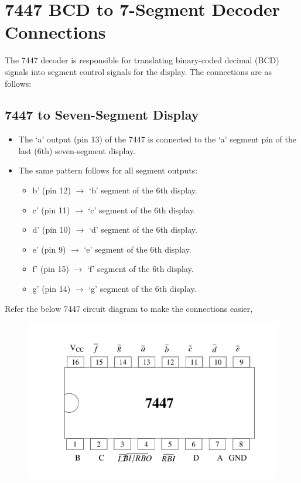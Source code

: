 \documentclass[journal]{IEEEtran}
\begin{document}
\section{7447 BCD to 7-Segment Decoder Connections}

The 7447 decoder is responsible for translating binary-coded decimal (BCD) signals into segment control signals for the display. The connections are as follows:

\subsection{7447 to Seven-Segment Display}

\begin{itemize}
    \item The ‘a’ output (pin 13) of the 7447 is connected to the ‘a’ segment pin of the last (6th) seven-segment display.
    \item The same pattern follows for all segment outputs:
    \begin{itemize}
        \item b’ (pin 12) $\rightarrow$ ‘b’ segment of the 6th display.
        \item c’ (pin 11) $\rightarrow$ ‘c’ segment of the 6th display.
        \item d’ (pin 10) $\rightarrow$ ‘d’ segment of the 6th display.
        \item e’ (pin 9) $\rightarrow$ ‘e’ segment of the 6th display.
        \item f’ (pin 15) $\rightarrow$ ‘f’ segment of the 6th display.
        \item g’ (pin 14) $\rightarrow$ ‘g’ segment of the 6th display.\\
    \end{itemize}
\end{itemize}

Refer the below 7447 circuit diagram to make the connections easier,

\begin{figure}[h!]
   \centering
   \includegraphics[width=0.65\columnwidth]{figs/7447.png}
   \label{stemplot}
\end{figure}
\end{document}
